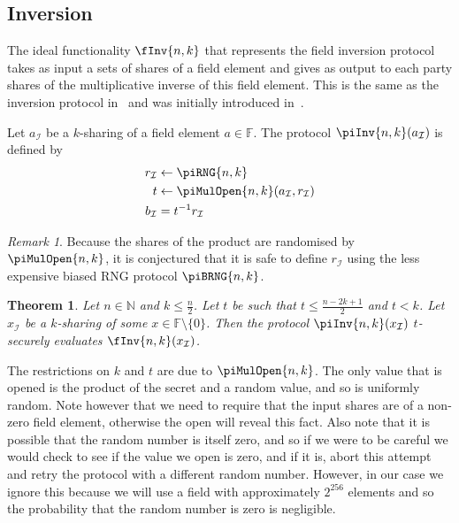 \documentclass{article}
\newtheorem{theorem}{Theorem}
\theoremstyle{remark}
\newtheorem{remark}{Remark}
\newcommand{\N}{\mathbb{N}}
\newcommand{\F}{\mathbb{F}}
\begin{document}
\subsection{Inversion}

The ideal functionality $\fInv{n,k}$ that represents the field inversion
protocol takes as input a sets of shares of a field element and gives as output
to each party shares of the multiplicative inverse of this field element. This
is the same as the inversion protocol in~\cite{gjkr96} and was initially
introduced in~\cite{bb89}.

Let $a_\mathcal{I}$ be a $k$-sharing of a field element $a \in \F$. The
protocol $\piInv{n,k}(a_\mathcal{I})$ is defined by
\begin{align*}
	r_\mathcal{I} &\leftarrow \piRNG{n,k}\\
	t &\leftarrow \piMulOpen{n,k}(a_\mathcal{I}, r_\mathcal{I})\\
	b_\mathcal{I} &= t^{-1}r_\mathcal{I}
\end{align*}

\begin{remark}
	Because the shares of the product are randomised by $\piMulOpen{n,k}$, it
	is conjectured that it is safe to define $r_\mathcal{I}$ using the less
	expensive biased RNG protocol $\piBRNG{n,k}$.
\end{remark}

\begin{theorem}
	Let $n \in \N$ and $k \le \frac{n}{2}$. Let $t$ be such that $t \le \frac{n
	- 2k + 1}{2}$ and $t < k$. Let $x_\mathcal{I}$ be a $k$-sharing of some $x
	\in \F \setminus \{0\}$. Then the protocol $\piInv{n,k}(x_\mathcal{I})$
	$t$-securely evaluates $\fInv{n,k}(x_\mathcal{I})$.
\end{theorem}

The restrictions on $k$ and $t$ are due to $\piMulOpen{n,k}$. The only value
that is opened is the product of the secret and a random value, and so is
uniformly random. Note however that we need to require that the input shares
are of a non-zero field element, otherwise the open will reveal this fact. Also
note that it is possible that the random number is itself zero, and so if we
were to be careful we would check to see if the value we open is zero, and if
it is, abort this attempt and retry the protocol with a different random
number. However, in our case we ignore this because we will use a field with
approximately $2^{256}$ elements and so the probability that the random number
is zero is negligible.
\end{document}
